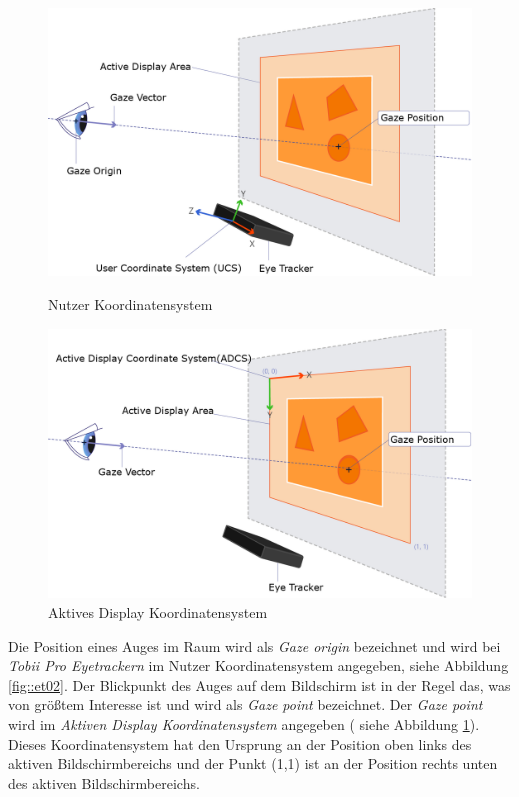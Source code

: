 \begin{figure}[]
	\centering
	\begin{minipage}[b]{0.49\textwidth}
		\centering
		\includegraphics[width=1\textwidth]{../../Grafiken/UCS.png}
		\caption{Nutzer Koordinatensystem \cite{tobiisdk}}
		\label{fig::et02}
	\end{minipage}
	\hfill
	\begin{minipage}[b]{0.49\textwidth}
		\centering
		\includegraphics[width=1\textwidth]{../../Grafiken/ADCS.png}
		\caption{Aktives Display Koordinatensystem \cite{tobiisdk}}
		\label{fig::et03}
	\end{minipage}
\end{figure}

Die Position eines Auges im Raum wird als \emph{Gaze origin} bezeichnet und wird bei \emph{Tobii Pro Eyetrackern} im Nutzer Koordinatensystem angegeben, siehe Abbildung \ref{fig::et02}.
Der Blickpunkt des Auges auf dem Bildschirm ist in der Regel das, was von größtem Interesse ist und wird als \emph{Gaze point} bezeichnet.
Der \emph{Gaze point} wird im \emph{Aktiven Display Koordinatensystem} angegeben ( siehe Abbildung \ref{fig::et03}).
Dieses Koordinatensystem hat den Ursprung an der Position oben links des aktiven Bildschirmbereichs und der Punkt (1,1) ist an der Position rechts unten des aktiven Bildschirmbereichs.

